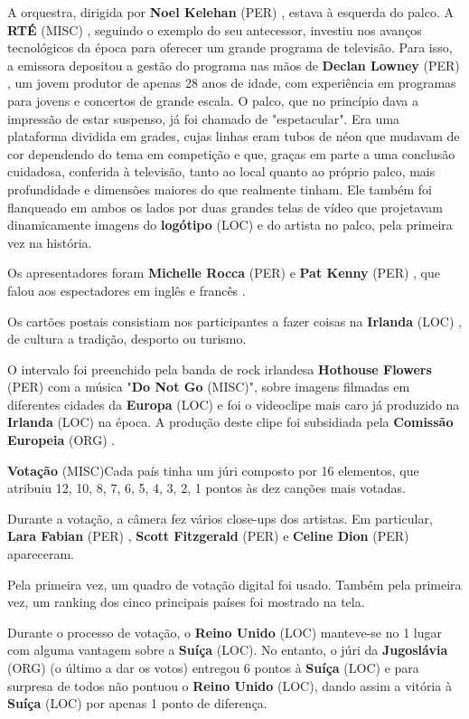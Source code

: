 \documentclass[12pt,a4paper]{article}
\begin{document}
A orquestra, dirigida por \textbf{Noel Kelehan} (PER) , estava à esquerda do palco. A \textbf{RTÉ} (MISC) , seguindo o exemplo do seu antecessor, investiu nos avanços tecnológicos da época para oferecer um grande programa de televisão. Para isso, a emissora depositou a gestão do programa nas mãos de \textbf{Declan Lowney} (PER) , um jovem produtor de apenas 28 anos de idade, com experiência em programas para jovens e concertos de grande escala. O palco, que no princípio dava a impressão de estar suspenso, já foi chamado de "espetacular". Era uma plataforma dividida em grades, cujas linhas eram tubos de néon que mudavam de cor dependendo do tema em competição e que, graças em parte a uma conclusão cuidadosa, conferida à televisão, tanto ao local quanto ao próprio palco, mais profundidade e dimensões maiores do que realmente tinham. Ele também foi flanqueado em ambos os lados por duas grandes telas de vídeo que projetavam dinamicamente imagens do \textbf{logótipo} (LOC) e do artista no palco, pela primeira vez na história.

Os apresentadores foram \textbf{Michelle Rocca} (PER) e \textbf{Pat Kenny} (PER) , que falou aos espectadores em inglês e francês .

Os cartões postais consistiam nos participantes a fazer coisas na \textbf{Irlanda} (LOC) , de cultura a tradição, desporto ou turismo.

O intervalo foi preenchido pela banda de rock irlandesa \textbf{Hothouse Flowers} (PER) com a música "\textbf{Do Not Go} (MISC)", sobre imagens filmadas em diferentes cidades da \textbf{Europa} (LOC) e foi o videoclipe mais caro já produzido na \textbf{Irlanda} (LOC) na época. A produção deste clipe foi subsidiada pela \textbf{Comissão Europeia} (ORG) .



\textbf{Votação} (MISC)Cada país tinha um júri composto por 16 elementos, que atribuiu 12, 10, 8, 7, 6, 5, 4, 3, 2, 1 pontos às dez canções mais votadas.

Durante a votação, a câmera fez vários close-ups dos artistas. Em particular, \textbf{Lara Fabian} (PER) , \textbf{Scott Fitzgerald} (PER) e \textbf{Celine Dion} (PER) apareceram.

Pela primeira vez, um quadro de votação digital foi usado. Também pela primeira vez, um ranking dos cinco principais países foi mostrado na tela.

Durante o processo de votação, o \textbf{Reino Unido} (LOC) manteve-se no 1 lugar com alguma vantagem sobre a \textbf{Suíça} (LOC). No entanto, o júri da \textbf{Jugoslávia} (ORG) (o último a dar os votos) entregou 6 pontos à \textbf{Suíça} (LOC) e para surpresa de todos não pontuou o \textbf{Reino Unido} (LOC), dando assim a vitória à \textbf{Suíça} (LOC) por apenas 1 ponto de diferença.
\end{document}
